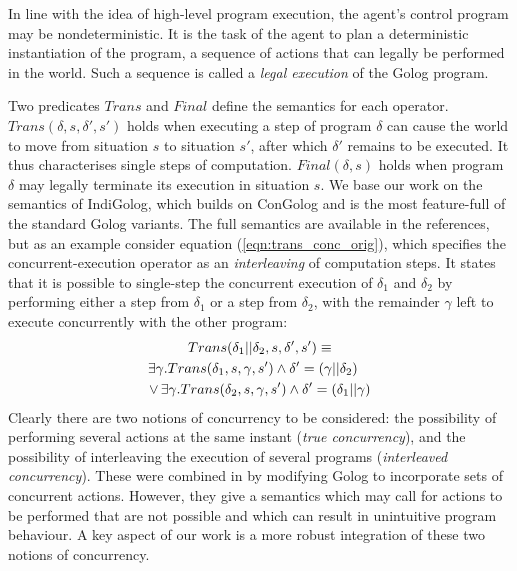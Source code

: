 In line with the idea of high-level program execution, the agent's
control program may be nondeterministic. It is the task of the agent
to plan a deterministic instantiation of the program, a sequence of
actions that can legally be performed in the world. Such a sequence
is called a \emph{legal execution} of the Golog program.

Two predicates $Trans$ and $Final$ define the semantics for each
operator. $Trans(\delta,s,\delta',s')$ holds when executing a step
of program $\delta$ can cause the world to move from situation $s$
to situation $s'$, after which $\delta'$ remains to be executed.
It thus characterises single steps of computation. $Final(\delta,s)$
holds when program $\delta$ may legally terminate its execution in
situation $s$. We base our work on the semantics of IndiGolog, which
builds on ConGolog and is the most feature-full of the standard Golog
variants. The full semantics are available in the references, but
as an example consider equation (\ref{eqn:trans_conc_orig}), which
specifies the concurrent-execution operator as an \emph{interleaving}
of computation steps. It states that it is possible to single-step
the concurrent execution of $\delta_{1}$ and $\delta_{2}$ by performing
either a step from $\delta_{1}$ or a step from $\delta_{2}$, with
the remainder $\gamma$ left to execute concurrently with the other
program:\begin{multline}
Trans(\delta_{1}||\delta_{2},s,\delta',s')\equiv\\
\shoveright{\exists\gamma.Trans(\delta_{1},s,\gamma,s')\wedge\delta'=(\gamma||\delta_{2})}\\
\vee\,\exists\gamma.Trans(\delta_{2},s,\gamma,s')\wedge\delta'=(\delta_{1}||\gamma)\label{eqn:trans_conc_orig}\end{multline}
 Clearly there are two notions of concurrency to be considered: the
possibility of performing several actions at the same instant (\emph{true
concurrency}), and the possibility of interleaving the execution of
several programs (\emph{interleaved concurrency}). These were combined
in \citet{pinto99tcongolog} by modifying Golog to incorporate sets
of concurrent actions. However, they give a semantics which may call
for actions to be performed that are not possible and which can result
in unintuitive program behaviour. A key aspect of our work is a more
robust integration of these two notions of concurrency.

